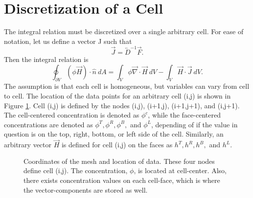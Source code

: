 \documentclass[11pt,letterpaper,oneside,notitlepage]{article}	%
\newcommand{\tensor}{\overleftrightarrow}		%
\newcommand{\del}{\vec\nabla}				%
\newcommand{\pindent}[1]{\hspace{6mm}}  		%
\numberwithin{equation}{section}				%
\begin{document}
\section{Discretization of a Cell}%
\pindent{}The integral relation must be discretized over a single arbitrary cell. For ease of notation, let us define a vector J such that
\begin{equation}
\vec J = \tensor D^{-1}\vec F \label{DefJ}.
\end{equation}
Then the integral relation is 
\begin{equation}
\oint_{\partial V}(\phi\vec H)\cdot\hat n\ dA = \int_V\phi\del\cdot\vec H\ dV - \int_V\vec H\cdot \vec J\ dV\label{IntID}.
\end{equation}
The assumption is that each cell is homogeneous, but variables can vary from cell to cell\cite{Morel1998}.  The location of the data points for an arbitrary cell (i,j) is shown in Figure \ref{Fig-Labels-Layout}.  Cell (i,j) is defined by the nodes (i,j), (i+1,j), (i+1,j+1), and (i,j+1).  The cell-centered concentration is denoted as $\phi^c$, while the face-centered concentrations are denoted as $\phi^T, \phi^R, \phi^B,$ and $\phi^L$, depending of if the value in question is on the top, right, bottom, or left side of the cell.  Similarly, an arbitrary vector $\vec H$ is defined for cell (i,j) on the faces as $h^T, h^R, h^B,$ and $h^L$.

\begin{figure}[ht]
\centering		%
\caption{Coordinates of the mesh and location of data.  These four nodes define cell (i,j). The concentration, $\phi$, is located at cell-center.  Also, there exists concentration values on each cell-face, which is where the vector-components are stored as well.}
\label{Fig-Labels-Layout}
\end{figure}
\end{document}
